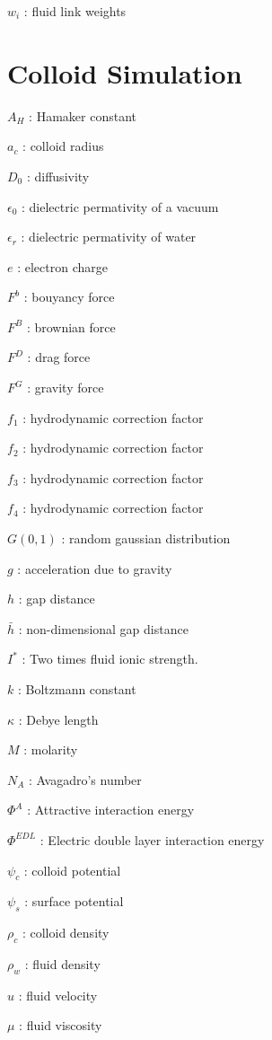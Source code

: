 \documentclass[letterpaper,10pt,english]{sphinxmanual}
\begin{document}
\(w_{i}\) : fluid link weights


\section{Colloid Simulation}
\label{\detokenize{index:colloid-simulation}}
\(A_{H}\) : Hamaker constant

\(a_{c}\) : colloid radius

\(D_{0}\) : diffusivity

\(\epsilon_{0}\) : dielectric permativity of a vacuum

\(\epsilon_{r}\) : dielectric permativity of water

\(e\) : electron charge

\(F^{b}\) : bouyancy force

\(F^{B}\) : brownian force

\(F^{D}\) : drag force

\(F^{G}\) : gravity force

\(f_{1}\) : hydrodynamic correction factor

\(f_{2}\) : hydrodynamic correction factor

\(f_{3}\) : hydrodynamic correction factor

\(f_{4}\) : hydrodynamic correction factor

\(G(0, 1)\) : random gaussian distribution

\(g\) : acceleration due to gravity

\(h\) : gap distance

\(\bar{h}\) : non-dimensional gap distance

\(I^{*}\) : Two times fluid ionic strength.

\(k\) : Boltzmann constant

\(\kappa\) : Debye length

\(M\) : molarity

\(N_{A}\) : Avagadro’s number

\(\Phi^{A}\) : Attractive interaction energy

\(\Phi^{EDL}\) : Electric double layer interaction energy

\(\psi_{c}\) : colloid potential

\(\psi_{s}\) : surface potential

\(\rho_{c}\) : colloid density

\(\rho_{w}\) : fluid density

\(u\) : fluid velocity

\(\mu\) : fluid viscosity
\end{document}
